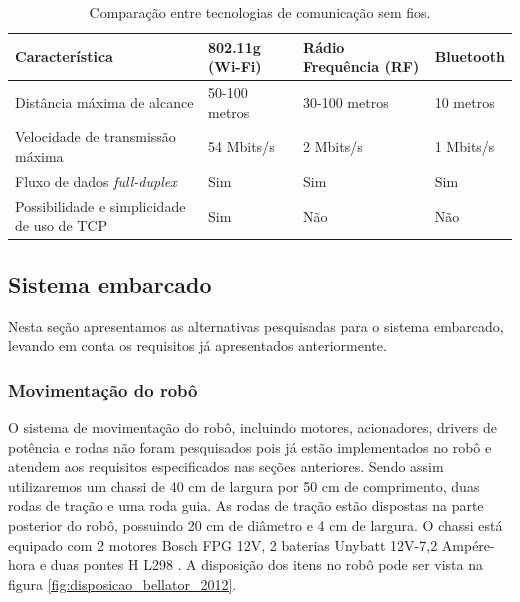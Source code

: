 \begin{table}[h]
  \caption{Comparação entre tecnologias de comunicação sem fios.}
  \centering
  \begin{tabular}{p{4.5cm}|p{3cm}p{4cm}p{2cm}}
    \toprule
    \textbf{Característica} & \textbf{802.11g (Wi-Fi)} & \multicolumn{1}{l}{\textbf{Rádio Frequência (RF)}} & \textbf{Bluetooth}  \\
    \hline
    Distância máxima de alcance & 50-100 metros  & 30-100 metros & 10 metros \\
    \hline
    Velocidade de transmissão máxima & 54 Mbits/s & 2 Mbits/s & 1 Mbits/s \\
    \hline
    Fluxo de dados \textit{full-duplex} & Sim & Sim & Sim \\
    \hline
    Possibilidade e simplicidade de uso de TCP & Sim & Não & Não \\
    \bottomrule
  \end{tabular}
  \label{tab:alternativas_comunicacao}
\end{table}



\subsection{Sistema embarcado}

Nesta seção apresentamos as alternativas pesquisadas para o sistema embarcado, levando em conta os requisitos já apresentados anteriormente.

\subsubsection{Movimentação do robô}

O sistema de movimentação do robô, incluindo motores, acionadores, drivers de potência e rodas não foram pesquisados pois já estão implementados no robô e atendem aos requisitos especificados nas seções anteriores. Sendo assim utilizaremos um chassi de 40 cm de largura por 50 cm de comprimento, duas rodas de tração e uma roda guia. As rodas de tração estão dispostas na parte posterior do robô, possuindo 20 cm de diâmetro e 4 cm de largura. O chassi está equipado com 2 motores Bosch FPG 12V, 2 baterias Unybatt 12V-7,2 Ampére-hora e duas pontes H L298 \cite{bellator_2012}. A disposição dos itens no robô pode ser vista na figura \ref{fig:disposicao_bellator_2012}.

